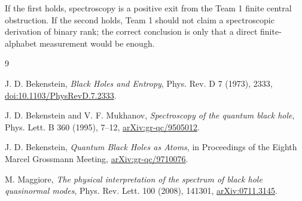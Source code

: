 \documentclass[12pt]{article}
\theoremstyle{remark}
\begin{document}
If the first holds, spectroscopy is a positive exit from the Team 1 finite
central obstruction.  If the second holds, Team 1 should not claim a
spectroscopic derivation of binary rank; the correct conclusion is only that a
direct finite-alphabet measurement would be enough.

\begin{thebibliography}{9}

J. D. Bekenstein,
\emph{Black Holes and Entropy},
Phys. Rev. D 7 (1973), 2333,
\href{https://link.aps.org/doi/10.1103/PhysRevD.7.2333}{doi:10.1103/PhysRevD.7.2333}.

J. D. Bekenstein and V. F. Mukhanov,
\emph{Spectroscopy of the quantum black hole},
Phys. Lett. B 360 (1995), 7--12,
\href{https://arxiv.org/abs/gr-qc/9505012}{arXiv:gr-qc/9505012}.

J. D. Bekenstein,
\emph{Quantum Black Holes as Atoms},
in Proceedings of the Eighth Marcel Grossmann Meeting,
\href{https://arxiv.org/abs/gr-qc/9710076}{arXiv:gr-qc/9710076}.

M. Maggiore,
\emph{The physical interpretation of the spectrum of black hole quasinormal modes},
Phys. Rev. Lett. 100 (2008), 141301,
\href{https://arxiv.org/abs/0711.3145}{arXiv:0711.3145}.

\end{thebibliography}
\end{document}
